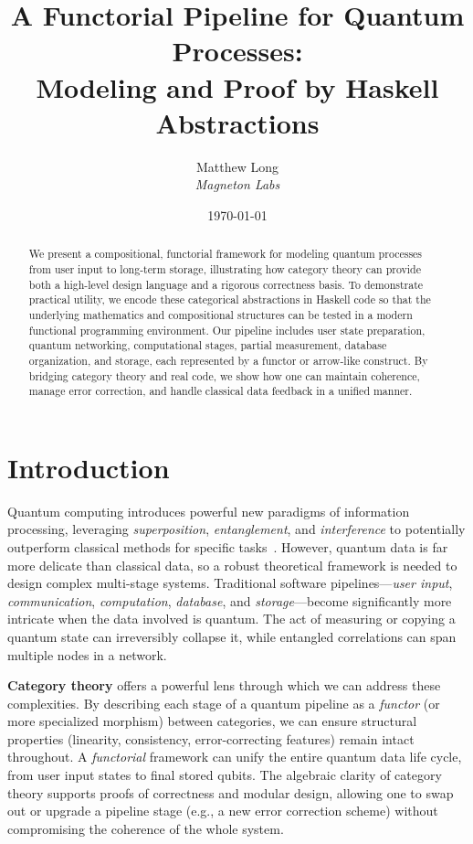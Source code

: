 \documentclass[12pt]{article}
\title{\textbf{A Functorial Pipeline for Quantum Processes: \\
Modeling and Proof by Haskell Abstractions}}
\author{
  Matthew Long \\
  \textit{Magneton Labs}
}
\date{\today}
\begin{document}
\maketitle

\begin{abstract}
We present a compositional, functorial framework for modeling quantum
processes from user input to long-term storage, illustrating how
category theory can provide both a high-level design language
and a rigorous correctness basis. To demonstrate practical utility,
we encode these categorical abstractions in Haskell code so that the
underlying mathematics and compositional structures can be tested in
a modern functional programming environment. Our pipeline includes
user state preparation, quantum networking, computational stages,
partial measurement, database organization, and storage, each
represented by a functor or arrow-like construct. By bridging
category theory and real code, we show how one can maintain
coherence, manage error correction, and handle classical data
feedback in a unified manner.
\end{abstract}

\tableofcontents

\section{Introduction}
Quantum computing introduces powerful new paradigms of information
processing, leveraging \emph{superposition}, \emph{entanglement},
and \emph{interference} to potentially outperform classical methods
for specific tasks~\cite{nielsenChuang, preskill}. However, quantum
data is far more delicate than classical data, so a robust theoretical
framework is needed to design complex multi-stage systems. Traditional
software pipelines---\emph{user input}, \emph{communication}, \emph{computation},
\emph{database}, and \emph{storage}---become significantly more intricate
when the data involved is quantum. The act of measuring or copying
a quantum state can irreversibly collapse it, while entangled
correlations can span multiple nodes in a network.

\textbf{Category theory} offers a powerful lens through which we
can address these complexities. By describing each stage of a quantum
pipeline as a \emph{functor} (or more specialized morphism) between
categories, we can ensure structural properties (linearity, consistency,
error-correcting features) remain intact throughout. A \emph{functorial}
framework can unify the entire quantum data life cycle, from user
input states to final stored qubits. The algebraic clarity of category
theory supports proofs of correctness and modular design, allowing
one to swap out or upgrade a pipeline stage (e.g., a new error correction
scheme) without compromising the coherence of the whole system.
\end{document}
